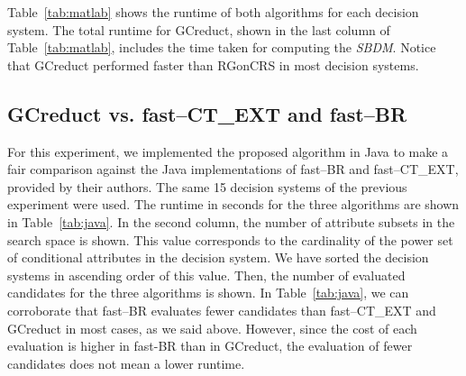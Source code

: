 \documentclass[number,preprint,review,12pt]{elsarticle}
\begin{document}
	Table~\ref{tab:matlab} shows the runtime of both algorithms for each decision system. The total runtime for GCreduct, shown in the last column of Table~\ref{tab:matlab}, includes the time taken for computing the \textit{SBDM}. Notice that GCreduct performed faster than RGonCRS in most decision systems.

\subsection{GCreduct vs. fast--CT\_EXT and fast--BR}\label{sub:java}
	
	For this experiment, we implemented the proposed algorithm in Java to make a fair comparison against the Java implementations of fast--BR and fast--CT\_EXT, provided by their authors. The same 15 decision systems of the previous experiment were used. The runtime in seconds for the three algorithms are shown in Table~\ref{tab:java}. In the second column, the number of attribute subsets in the search space is shown. This value corresponds to the cardinality of the power set of conditional attributes in the decision system. We have sorted the decision systems in ascending order of this value. Then, the number of evaluated candidates for the three algorithms is shown. In Table~\ref{tab:java}, we can corroborate that fast--BR evaluates fewer candidates than fast--CT\_EXT and GCreduct in most cases, as we said above. However, since the cost of each evaluation is higher in fast-BR than in GCreduct, the evaluation of fewer candidates does not mean a lower runtime. 
	
\end{document}
